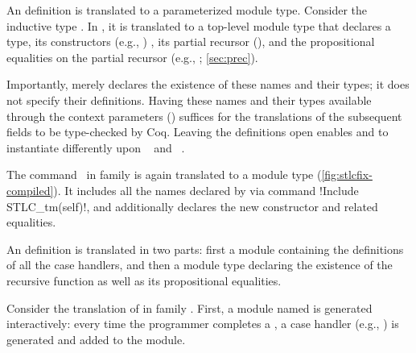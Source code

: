 



An  definition is translated to a parameterized module type.
Consider the inductive type .
In , it is translated to a top-level module type
 that declares a  type,
its constructors (e.g., ) ,
its partial recursor (),
and the propositional equalities on the partial recursor
(e.g., ; \cref{sec:prec}).

Importantly,
 merely declares the existence of these names and their types;
it does not specify their definitions.
Having these names and their types available through the context parameters ()
suffices for the translations of the subsequent fields to be type-checked by Coq.
Leaving the definitions open enables  and 
to instantiate  differently upon ~ and ~.

The command \dadada~in family
 is again translated to a module type  (\cref{fig:stlcfix-compiled}).
It includes all the names declared by 
via command \lsti!Include STLC\_tm(self)!,
and additionally declares
the new constructor  and related equalities.



An  definition is translated in two parts:
first a module containing the definitions of all the case handlers,
and then a module type declaring the existence of the recursive function as well as
its propositional equalities.

Consider the translation of  in family .
First, a module named  is generated interactively:
every time the programmer completes a , a case handler (e.g., )
is generated and added to the module.

